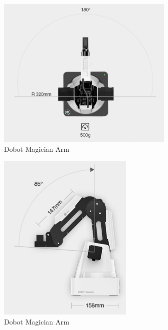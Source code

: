\documentclass[10pt,twocolumn,letterpaper]{article}
\begin{document}
\begin{figure}[t]
\begin{center}
	\includegraphics[width=0.8\linewidth]{dobot2.png}
\end{center}
   \caption{Dobot Magician Arm}
\label{fig:long}
\label{fig:onecol}
\end{figure}

\begin{figure}[t]
\begin{center}
	\includegraphics[width=0.8\linewidth]{dobot3.png}
\end{center}
   \caption{Dobot Magician Arm}
\label{fig:long}
\label{fig:onecol}
\end{figure}
\end{document}
